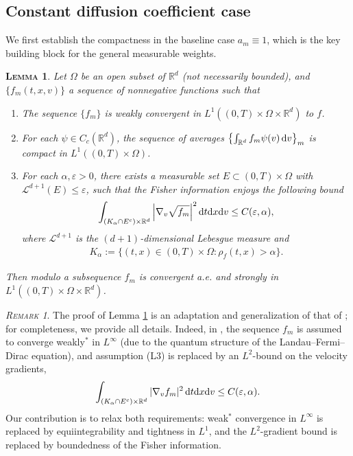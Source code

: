\documentclass[10pt, reqno]{amsart}
\theoremstyle{plain}
\newtheorem{lemma}[theorem]{\normalfont \scshape Lemma}
\theoremstyle{definition}
\theoremstyle{remark}
\newtheorem{remark}[theorem]{\normalfont \scshape Remark}
\numberwithin{equation}{section}
\newcommand{\scrL}{\mathscr L}
\newcommand{\R}{\mathbb{R}}
\newcommand{\ve}{\varepsilon}
\newcommand{\dx}{\textnormal{d}x}
\newcommand{\dv}{\textnormal{d}v}
\newcommand{\dt}{\textnormal{d}t}
\begin{document}
 
%
%
%
%
%
%
\subsection{Constant diffusion coefficient case}
 
We first establish the compactness in the baseline case $a_m\equiv1$, which is the
key building block for the general measurable weights.
 

\begin{lemma}\label{lem: key compactness}
    Let $\Omega$ be an open subset of $\R^d$ (not necessarily bounded), and $\{f_m(t,x,v)\}$ a sequence of nonnegative functions such that
    \begin{enumerate}[(L1)]
        \item The sequence $\{f_m\}$ is weakly convergent in $L^1((0,T)\times\Omega \times\R^d)$ to $f$.
        \item For each $\psi\in C_c(\R^d)$, the sequence of averages $\left\{\int_{\R^d} f_m \psi(v) \,\dv \right\}_m$ is compact in $L^1((0,T)\times \Omega)$.
        \item For each $\alpha,\ve>0$, there exists a measurable set $E\subset (0,T)\times\Omega$ with $\mathscr{L}^{d+1}(E) \le \ve$, such that the Fisher information enjoys the following bound
        \begin{align*}
            \int_{(K_\alpha \cap E^c) \times \R^d} \left|\nabla_v \sqrt{f_m} \right|^2 \dt\dx\dv \le C(\ve,\alpha),
        \end{align*}
        where $\scrL^{d+1}$ is the $(d+1)$-dimensional Lebesgue measure and
        \begin{align*}
            K_\alpha := \{(t,x)\in (0,T)\times\Omega: \rho_f(t,x) > \alpha \}.
        \end{align*}
    \end{enumerate}
    Then modulo a subsequence $f_m$ is convergent a.e. and strongly in $L^1((0,T)\times\Omega\times\R^d)$.
\end{lemma}

\begin{remark} \label{rem: samp}
    The proof of Lemma \ref{lem: key compactness} is an adaptation and generalization of that of \cite[Proposition 2]{sampaio2024}; for completeness, we provide all details. Indeed, in \cite{sampaio2024}, the sequence $f_m$ is assumed to converge weakly$^*$ in $L^\infty$ (due to the quantum structure of the Landau--Fermi--Dirac equation), and assumption (L3) is replaced by an $L^2$-bound on the velocity gradients,
    \begin{align*}
        \int_{(K_\alpha\cap E^c)\times\R^d} |\nabla_v f_m|^2\,\dt\dx\dv \le C(\ve,\alpha).
    \end{align*}
Our contribution is to relax both requirements: 
weak$^*$ convergence in $L^\infty$ is replaced by equiintegrability and tightness in $L^1$, 
and the $L^2$-gradient bound is replaced by boundedness of the Fisher information.
\end{remark}
\end{document}
